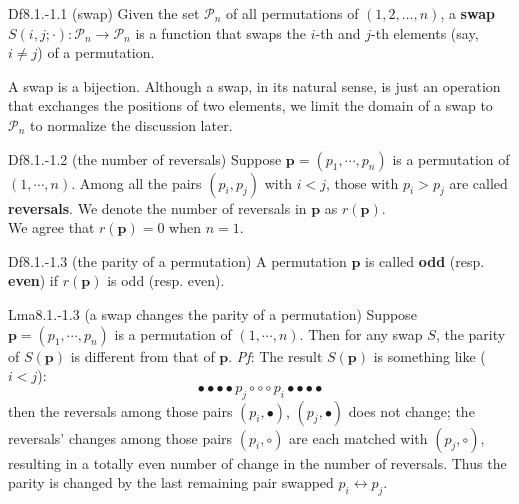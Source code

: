 \documentclass{article}
\begin{document}
\begin{Df}{Df8.1.-1.1 (swap)}
    Given the set $\mathcal{P}_n$ of all permutations of $(1,2,\dots,n)$, a \textbf{swap} $S(i,j; \cdot): \mathcal{P}_n\to\mathcal{P}_n$ is a function that swaps the $i$-th and $j$-th elements (say, $i\neq j$) of a permutation. 
\end{Df}

\begin{Rmk}{}
    \textcolor{Th}{A swap is a bijection.} Although a swap, in its natural sense, is just an operation that exchanges the positions of two elements, we limit the domain of a swap to $\mathcal{P}_n$ to normalize the discussion later.
\end{Rmk}

\begin{Df}{Df8.1.-1.2 (the number of reversals)}
    Suppose $\pmb{p} = (p_1, \cdots, p_n)$ is a permutation of $(1,\cdots,n)$. Among all the pairs $(p_i, p_j)$ with $i<j$, those with $p_i>p_j$ are called \textbf{reversals}. We denote the number of reversals in $\pmb{p}$ as $r(\pmb{p})$. \\
    We agree that $r(\pmb{p}) = 0$ when $n=1$.
\end{Df}

\begin{Df}{Df8.1.-1.3 (the parity of a permutation)}
    A permutation $\pmb{p}$ is called \textbf{odd} (resp. \textbf{even}) if $r(\pmb{p})$ is odd (resp. even). 
\end{Df}

\begin{Th}{Lma8.1.-1.3 (a swap changes the parity of a permutation)}
    Suppose $\pmb{p} = (p_1, \cdots, p_n)$ is a permutation of $(1,\cdots,n)$. Then for any swap $S$, the parity of $S(\pmb{p})$ is different from that of $\pmb{p}$.
    \tcblower
    \textit{Pf}: The result $S(\pmb{p})$ is something like ($i<j$):
    $$ \bullet\bullet\bullet\bullet p_j\circ\circ\circ p_i\bullet\bullet\bullet\bullet $$
    then the reversals among those pairs $(p_i,\bullet)$, $(p_j,\bullet)$ does not change; the reversals' changes among those pairs $(p_i, \circ)$ are each matched with $(p_j, \circ)$, resulting in a totally even number of change in the number of reversals. Thus the parity is changed by the last remaining pair swapped $p_i\leftrightarrow p_j$. 
\end{Th}
\end{document}
